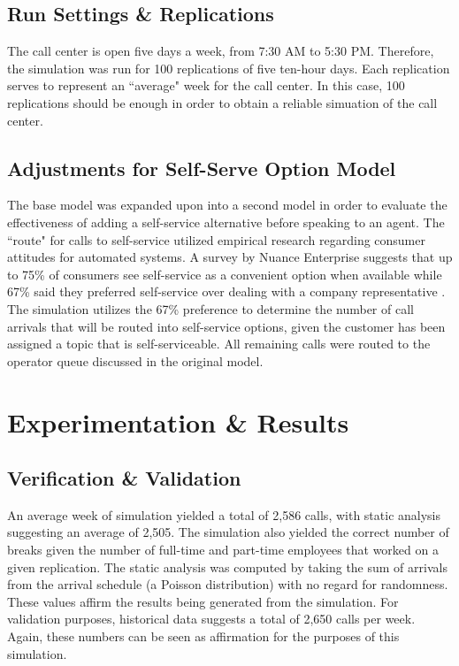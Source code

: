\documentclass[12pt,twocolumn]{article}
\begin{document}
	\subsection{Run Settings \& Replications}
	
	 The call center is open five days a week, from 7:30 AM to 5:30 PM.  Therefore, the simulation was run for 100 replications of five ten-hour days.  Each replication serves to represent an ``average" week for the call center.  In this case, 100 replications should be enough in order to obtain a reliable simuation of the call center.
	 
	 
	\subsection{Adjustments for Self-Serve Option Model}
	
	The base model was expanded upon into a second model in order to evaluate the effectiveness of adding a self-service alternative before speaking to an agent.  The ``route" for calls to self-service utilized empirical research regarding consumer attitudes for automated systems.  A survey by Nuance Enterprise suggests that up to 75\% of consumers see self-service as a convenient option when available while 67\% said they preferred self-service over dealing with a company representative \cite{webblog}.  The simulation utilizes the 67\% preference to determine the number of call arrivals that will be routed into self-service options, given the customer has been assigned a topic that is self-serviceable.  All remaining calls were routed to the operator queue discussed in the original model.

\section{Experimentation \& Results}

	\subsection{Verification \& Validation}
	
	
	  An average week of simulation yielded a total of 2,586 calls, with static analysis suggesting an average of 2,505.  The simulation also yielded the correct number of breaks given the number of full-time and part-time employees that worked on a given replication.  The static analysis was computed by taking the sum of arrivals from the arrival schedule (a Poisson distribution) with no regard for randomness.  These values affirm the results being generated from the simulation.  For validation purposes, historical data suggests a total of 2,650 calls per week.  Again, these numbers can be seen as affirmation for the purposes of this simulation.
	  
\end{document}
